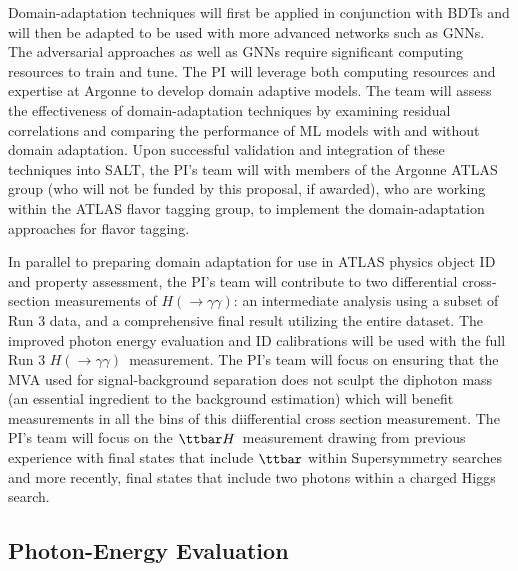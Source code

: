\documentclass[letter, USenglish, 11pt, subfigure]{article}
\newcommand{\tth}{\ensuremath{\ttbar H}}
\newcommand{\hyy}{\ensuremath{H(\to\gamma\gamma)}}
\begin{document}
Domain-adaptation techniques will first be applied in conjunction with BDTs and will then be adapted to be used with more advanced networks such as GNNs. The adversarial approaches as well as GNNs require significant computing resources to train and tune. The PI will leverage both computing resources and expertise at Argonne to develop domain adaptive models.
The team will assess the effectiveness of domain-adaptation techniques by examining residual correlations and comparing the performance of ML models with and without domain adaptation. Upon successful validation and integration of these techniques into SALT, the PI's team will with members of the Argonne ATLAS group (who will not be funded by this proposal, if awarded), who are working within the ATLAS flavor tagging group, to implement the domain-adaptation approaches for flavor tagging.

In parallel to preparing domain adaptation for use in ATLAS physics object ID and property assessment, the PI's team will contribute to two differential cross-section measurements of \hyy: an intermediate analysis using a subset of Run 3 data, and a comprehensive final result utilizing the entire dataset. The improved photon energy evaluation and ID calibrations will be used with the full Run 3 \hyy\  measurement. The PI's team will focus on ensuring that the MVA used for signal-background separation does not sculpt the diphoton mass (an essential ingredient to the background estimation) which will benefit measurements in all the bins of this diifferential cross section measurement. The PI's team will focus on the \tth\ measurement drawing from previous experience with final states that include $\ttbar$ within Supersymmetry searches and more recently, final states that include two photons within a charged Higgs search. 


\subsection{Photon-Energy Evaluation}
\end{document}
